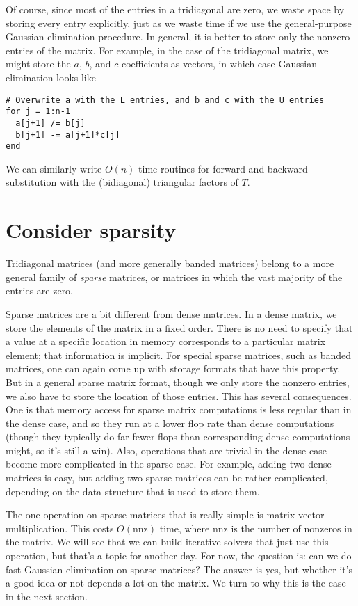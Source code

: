 \documentclass[12pt, leqno]{article}
\begin{document}
Of course, since most of the entries in a tridiagonal are zero,
we waste space by storing every entry explicitly, just as we waste
time if we use the general-purpose Gaussian elimination procedure.
In general, it is better to store only the nonzero entries of the
matrix.  For example, in the case of the tridiagonal matrix,
we might store the $a$, $b$, and $c$ coefficients as vectors,
in which case Gaussian elimination looks like
\begin{lstlisting}
# Overwrite a with the L entries, and b and c with the U entries
for j = 1:n-1
  a[j+1] /= b[j]
  b[j+1] -= a[j+1]*c[j]
end
\end{lstlisting}

We can similarly write $O(n)$ time routines for forward and backward
substitution with the (bidiagonal) triangular factors of $T$.

\section{Consider sparsity}

Tridiagonal matrices (and more generally banded matrices) belong to
a more general family of {\em sparse} matrices, or matrices in which
the vast majority of the entries are zero.

Sparse matrices are a bit different from dense matrices.  In a dense
matrix, we store the elements of the matrix in a fixed order.  There
is no need to specify that a value at a specific location in memory
corresponds to a particular matrix element; that information is
implicit.  For special sparse matrices, such as banded matrices, one
can again come up with storage formats that have this property.  But
in a general sparse matrix format, though we only store the nonzero
entries, we also have to store the location of those entries.  This
has several consequences.  One is that memory access for sparse matrix
computations is less regular than in the dense case, and so they run
at a lower flop rate than dense computations (though they typically do
far fewer flops than corresponding dense computations might, so it's
still a win).  Also, operations that are trivial in the dense case
become more complicated in the sparse case.  For example, adding two
dense matrices is easy, but adding two sparse matrices can be rather
complicated, depending on the data structure that is used to store
them.

The one operation on sparse matrices that is really simple is
matrix-vector multiplication.  This costs $O(\mathrm{nnz})$ time,
where nnz is the number of nonzeros in the matrix.  We will see that
we can build iterative solvers that just use this operation, but
that's a topic for another day.  For now, the question is: can we do
fast Gaussian elimination on sparse matrices?  The answer is yes,
but whether it's a good idea or not depends a lot on the matrix.
We turn to why this is the case in the next section.
\end{document}
